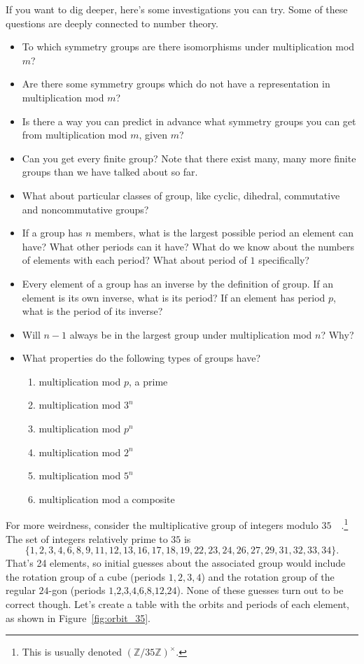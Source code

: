 \documentclass[../gatm.tex]{subfiles}
\begin{document}
\noindent If you want to dig deeper, here's some investigations you can try. Some of these questions are deeply connected to number theory.
\begin{itemize}
\item To which symmetry groups are there isomorphisms under multiplication mod $m$?
\item Are there some symmetry groups which do not have a representation in multiplication mod $m$?
\item Is there a way you can predict in advance what symmetry groups you can get from multiplication mod $m$, given $m$?
\item Can you get every finite group? Note that there exist many, many more finite groups than we have talked about so far.
\item What about particular classes of group, like cyclic, dihedral, commutative and noncommutative groups?
\item If a group has $n$ members, what is the largest possible period an element can have? What other periods can it have? What do we know about the numbers of elements with each period? What about period of $1$ specifically?
\item Every element of a group has an inverse by the definition of group. If an element is its own inverse, what is its period? If an element has period $p$, what is the period of its inverse?
\item Will $n-1$ always be in the largest group under multiplication mod $n$? Why?
\item What properties do the following types of groups have?
\begin{multicols}{2}
\begin{enumerate}
\item multiplication mod $p$, a prime
\item multiplication mod $3^n$
\item multiplication mod $p^n$
\item multiplication mod $2^n$
\item multiplication mod $5^n$
\item multiplication mod a composite
\end{enumerate}
\end{multicols}
\end{itemize}

\noindent For more weirdness, consider the multiplicative group of integers modulo $35\quad$.\footnote{This is usually denoted $(\mathbb{Z}/35\mathbb{Z})^\times$.} The set of integers relatively prime to $35$ is $$\{1,2,3,4,6,8,9,11,12,13,16,17,18,19,22,23,24,26,27,29,31,32,33,34\}.$$ That's 24 elements, so initial guesses about the associated group would include the rotation group of a cube (periods $1,2,3,4$) and the rotation group of the regular $24$-gon (periods $1$,$2$,$3$,$4$,$6$,$8$,$12$,$24$). None of these guesses turn out to be correct though. Let's create a table with the orbits and periods of each element, as shown in Figure~\ref{fig:orbit_35}.
\end{document}
